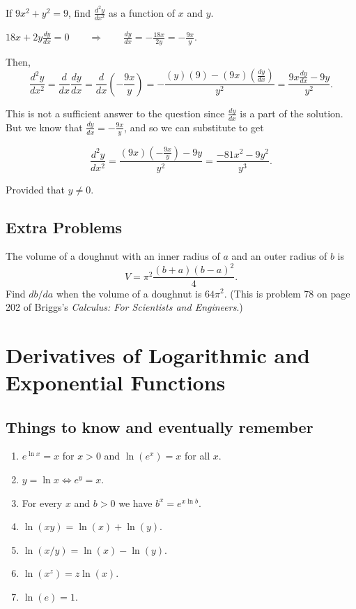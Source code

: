 \documentclass[handout]{ximera}
\newcommand{\dd}[2][]{\frac{d #1}{d #2}}
\newcommand{\ddx}{\frac{d}{dx}}
\renewenvironment{freeResponse}{
\ifhandout\setbox0\vbox\bgroup\else
\begin{trivlist}\item[\hskip \labelsep\bfseries Solution:\hspace{2ex}]
\fi}
{\ifhandout\egroup\else
\end{trivlist}
\fi}
\begin{document}
\begin{problem}
If $9x^2 + y^2 = 9$, find $\dd[^2 y]{x^2}$ as a function of $x$ and $y$.
		\begin{freeResponse}
		$18x + 2y \dd[y]{x} = 0 \qquad \Longrightarrow \qquad \dd[y]{x} = - \frac{18x}{2y} = - \frac{9x}{y}$.
		
		Then,
		$$ \dd[^2y]{x^2} = \ddx \dd[y]{x} = \ddx \left( - \frac{9x}{y} \right) = - \frac{(y)(9) - (9x)(\dd[y]{x} )}{y^2} = \frac{9x\dd[y]{x} - 9y}{y^2}. $$
		
		This is not a sufficient answer to the question since $\dd[y]{x}$ is a part of the solution.  But we know that $\dd[y]{x} = -\frac{9x}{y}$, and so we can substitute to get
		
		$$ \dd[^2y]{x^2} = \frac{(9x) \left(- \frac{9x}{y} \right) - 9y}{y^2} = \frac{-81x^2 - 9y^2}{y^3}. $$
		
		Provided that $y \neq 0$.  
		\end{freeResponse}
\end{problem}

\subsection*{Extra Problems}
\begin{problem}
  The volume of a doughnut with an inner radius of $a$ and an outer radius of $b$ is 
  \[
    V = \pi^2 \frac{(b+a)(b-a)^2}{4}.
  \]
  Find $db/da$ when the volume of a doughnut is $64\pi^2$.
  (This is problem 78 on page 202 of Briggs's \textit{Calculus: For Scientists and Engineers}.)
\end{problem}


\section{Derivatives of Logarithmic and Exponential Functions}

\subsection*{Things to know and eventually remember}
\begin{enumerate}
  \item[(1)]
    $e^{\ln x} = x$ for $x > 0$ and $\ln(e^x) = x$ for all $x$.

  \item[(2)]
    $y = \ln x \iff e^y = x$.

  \item[(3)]
    For every $x$ and $b >0$ we have
    $
      b^x = e^{x \ln b}
    $.

  \item[(4)]
    $\ln(xy) = \ln(x) + \ln(y)$.

  \item[(5)]
    $\ln(x/y) = \ln(x) - \ln(y)$.

  \item[(6)]
    $\ln(x^z) = z \ln(x)$.

  \item[(7)]
    $\ln(e) = 1$.
\end{enumerate}
\end{document}
